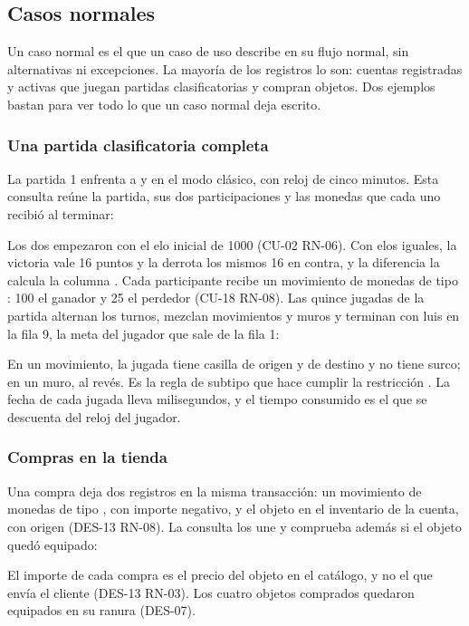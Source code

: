 \subsection*{Casos normales}

Un caso normal es el que un caso de uso describe en su flujo normal, sin alternativas ni excepciones. La mayoría de los registros lo son: cuentas registradas y activas que juegan partidas clasificatorias y compran objetos. Dos ejemplos bastan para ver todo lo que un caso normal deja escrito.

\subsubsection*{Una partida clasificatoria completa}

La partida 1 enfrenta a  y  en el modo clásico, con reloj de cinco minutos. Esta consulta reúne la partida, sus dos participaciones y las monedas que cada uno recibió al terminar:



Los dos empezaron con el elo inicial de 1000 (\mbox{CU-02} \mbox{RN-06}). Con elos iguales, la victoria vale 16 puntos y la derrota los mismos 16 en contra, y la diferencia la calcula la columna . Cada participante recibe un movimiento de monedas de tipo : 100 el ganador y 25 el perdedor (\mbox{CU-18} \mbox{RN-08}). Las quince jugadas de la partida alternan los turnos, mezclan movimientos y muros y terminan con luis en la fila 9, la meta del jugador que sale de la fila 1:



En un movimiento, la jugada tiene casilla de origen y de destino y no tiene surco; en un muro, al revés. Es la regla de subtipo que hace cumplir la restricción . La fecha de cada jugada lleva milisegundos, y el tiempo consumido es el que se descuenta del reloj del jugador.

\subsubsection*{Compras en la tienda}

Una compra deja dos registros en la misma transacción: un movimiento de monedas de tipo , con importe negativo, y el objeto en el inventario de la cuenta, con origen  (\mbox{DES-13} \mbox{RN-08}). La consulta los une y comprueba además si el objeto quedó equipado:



El importe de cada compra es el precio del objeto en el catálogo, y no el que envía el cliente (\mbox{DES-13} \mbox{RN-03}). Los cuatro objetos comprados quedaron equipados en su ranura (\mbox{DES-07}).
